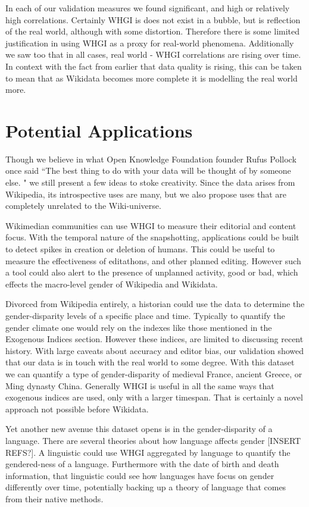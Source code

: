 \documentclass[letterpaper]{article}
\begin{document}
In each of our validation measures we found significant, and high or relatively high correlations. Certainly WHGI is does not exist in a bubble, but is reflection of the real world, although with some distortion. Therefore there is some limited justification in using WHGI as a proxy for real-world phenomena. Additionally we saw too that in all cases, real world - WHGI correlations are rising over time. In context with the fact from earlier that data quality is rising, this can be taken to mean that as Wikidata becomes more complete it is modelling the real world more.

\section{Potential Applications}
Though we believe in what Open Knowledge Foundation founder Rufus Pollock once said ``The best thing to do with your data will be thought of by someone else. " we still present a few ideas to stoke creativity. Since the data arises from Wikipedia, its introspective uses are many, but we also propose uses that are completely unrelated to the Wiki-universe. 

Wikimedian communities can use WHGI to measure their editorial and content focus. With the temporal nature of the snapshotting, applications could be built to detect spikes in creation or deletion of humans. This could be useful to measure the effectiveness of editathons, and other planned editing. However such a tool could also alert to the presence of unplanned activity, good or bad, which effects the macro-level gender of Wikipedia and Wikidata.

Divorced from Wikipedia entirely, a historian could use the data to determine the gender-disparity levels of a specific place and time. Typically to quantify the gender climate one would rely on the indexes like those mentioned in the Exogenous Indices section. However these indices, are limited to discussing recent history. With large caveats about accuracy and editor bias, our validation showed that our data is in touch with the real world to some degree. With this dataset we can quantify a type of gender-disparity of medieval France, ancient Greece, or Ming dynasty China. Generally WHGI is useful in all the same ways that exogenous indices are used, only with a larger timespan. That is certainly a novel approach not possible before Wikidata.

Yet another new avenue this dataset opens is in the gender-disparity of a language. There are several theories about how language affects gender [INSERT REFS?]. A linguistic could use WHGI aggregated by language to quantify the gendered-ness of a language. Furthermore with the date of birth and death information, that linguistic could see how languages have focus on gender differently over time, potentially backing up a theory of language that comes from their native methods. 
\end{document}
